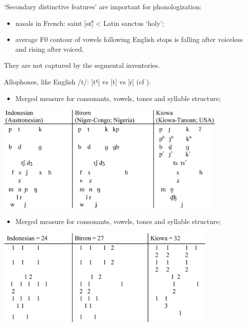 \documentclass[
  ignorenonframetext,
]{beamer}
\providecommand{\tightlist}{%
  \setlength{\itemsep}{0pt}\setlength{\parskip}{0pt}}
\begin{document}
\begin{frame}{\citep{ohala09}}
\protect\hypertarget{ohala09}{}
`Secondary distinctive features' are important for phonologization:

\begin{itemize}
\tightlist
\item
  nasals in French: saint {[}sɛ̃{]} \textless{} Latin sanctus `holy';
\item
  average F0 contour of vowels following English stops is falling after
  voiceless and rising after voiced.
\end{itemize}

They are not captured by the segmental inventories.

Allophones, like English /t/: {[}tʰ{]} vs {[}t{]} vs {[}ɾ{]} (cf
\citep{simpson99}).
\end{frame}

\begin{frame}{\citep{maddieson09}}
\protect\hypertarget{maddieson09}{}
\begin{itemize}
\tightlist
\item
  Merged measure for consonants, vowels, tones and syllable structure;
\end{itemize}

\includegraphics[width=4.52in]{images/maddieson09_ci}
\end{frame}

\begin{frame}{\citep{maddieson09}}
\protect\hypertarget{maddieson09-1}{}
\begin{itemize}
\tightlist
\item
  Merged measure for consonants, vowels, tones and syllable structure;
\end{itemize}

\includegraphics[width=4.31in]{images/maddieson09_cm}
\end{frame}
\end{document}
